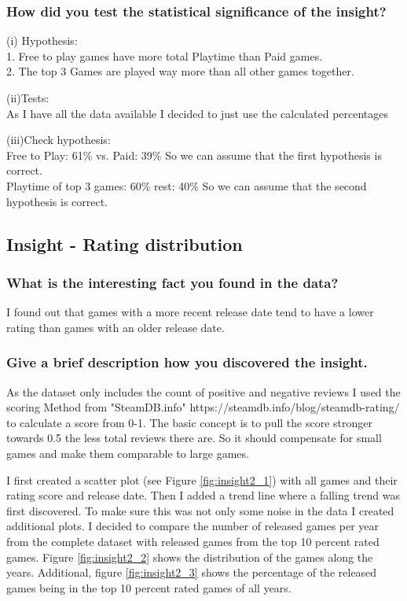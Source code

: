 \documentclass[11pt]{article}
\begin{document}
\subsubsection{How did you test the statistical significance of the insight?}

(i) Hypothesis:\\
1. Free to play games have more total Playtime than Paid games.\\
2. The top 3 Games are played way more than all other games together.

(ii)Tests:\\
As I have all the data available I decided to just use the calculated 
percentages

(iii)Check hypothesis:\\
Free to Play: 61\% vs. Paid: 39\% So we can assume that the first hypothesis is correct.\\
Playtime of top 3 games:  60\% rest: 40\% So we can assume that the second hypothesis is correct.

\subsection{Insight - Rating distribution}

\subsubsection{What is the interesting fact you found in the data?}

I found out that games with a more recent release date tend to have a lower rating than games with an older release date.\\

\subsubsection{Give a brief description how you discovered the
insight.}

As the dataset only includes the count of positive and negative reviews I used the scoring Method from "SteamDB.info" https://steamdb.info/blog/steamdb-rating/ to calculate a score from 0-1. The basic concept is to pull the score stronger towards 0.5 the less total reviews there are. So it should compensate for small  games and make them comparable to large games. 

I first created a scatter plot (see Figure \ref{fig:insight2_1}) with all games and their rating score and release date. Then I added a trend line where a falling trend was first discovered. To make sure this was not only some noise in the data I created additional plots. I decided to compare the number of released games per year from the complete dataset with released games from the top 10 percent rated games. Figure \ref{fig:insight2_2} shows the distribution of the games along the years. Additional, figure \ref{fig:insight2_3} shows the percentage of the released games being in the top 10 percent rated games of all years.  
\end{document}
